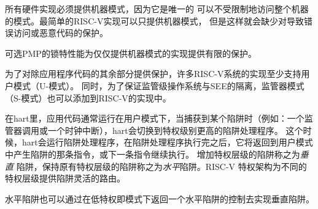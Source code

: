 所有硬件实现必须提供机器模式，因为它是唯一的
可以不受限制地访问整个机器的模式。最简单的RISC-V实现可以只提供机器模式，
但是这样就会缺少对导致错误访问或恶意代码的保护。

\begin{commentary}
  
  可选PMP的锁特性能为仅仅提供机器模式的实现提供有限的保护。
\end{commentary}


为了对除应用程序代码的其余部分提供保护，许多RISC-V系统的实现至少支持用户模式（U-模式）。
同时，为了保证监管级操作系统与SEE的隔离，监管器模式（S-模式）也可以添加到RISC-V的实现中。


在hart里，应用代码通常运行在用户模式下，当捕获到某个陷阱时（例如：一个监管器调用或一个时钟中断），hart会切换到特权级别更高的陷阱处理程序。
这个时候，hart会运行陷阱处理程序，在陷阱处理程序执行完之后，它将返回到用户模式中产生陷阱的那条指令，或下一条指令继续执行。
增加特权层级的陷阱称之为{\em 垂直} 陷阱，保持原有特权层级的陷阱称之为{\em 水平}陷阱。RISC-V
特权架构为不同的特权层级提供陷阱灵活的路由。

\begin{commentary}

水平陷阱也可以通过在低特权即模式下返回一个水平陷阱的控制去实现垂直陷阱。
\end{commentary}


